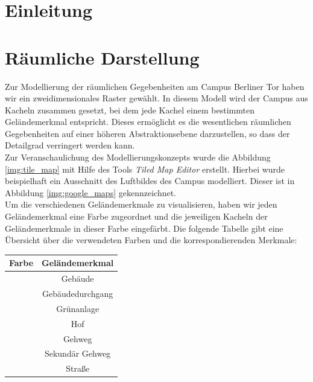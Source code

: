 \documentclass[10pt]{scrartcl}
\author{André Harms, Oliver Steenbuck, Armin Steudte  \\ Carsten Noetzel, Dennis Blauhut, Torben Becker}
\title{\titletext}
\date{26.10.2011}
\begin{document}
\maketitle

\setcounter{tocdepth}{3}
\tableofcontents
\listoffigures

\section{Einleitung}

\section{Räumliche Darstellung}
Zur Modellierung der räumlichen Gegebenheiten am Campus Berliner Tor haben wir ein zweidimensionales Raster gewählt.
In diesem Modell wird der Campus aus Kacheln zusammen gesetzt, bei dem jede Kachel einem bestimmten Geländemerkmal entspricht.
Dieses ermöglicht es die wesentlichen räumlichen Gegebenheiten auf einer höheren Abstraktionsebene darzustellen, so dass der Detailgrad verringert werden kann.\\
Zur Veranschaulichung des Modellierungskonzepts wurde die Abbildung \ref{img:tile_map} mit Hilfe des Tools \textit{Tiled Map Editor} erstellt. Hierbei wurde beispielhaft ein Ausschnitt des Luftbildes des Campus modelliert.
Dieser ist in Abbildung \ref{img:google_maps} gekennzeichnet.\\
Um die verschiedenen Geländemerkmale zu visualisieren, haben wir jeden Geländemerkmal eine Farbe zugeordnet und die jeweiligen Kacheln der Geländemerkmale in dieser Farbe eingefärbt. Die folgende Tabelle gibt eine Übersicht über die verwendeten Farben und die korrespondierenden Merkmale:


\begin{tabular}{|c|c|}
\hline 
\textbf{Farbe} & \textbf{Geländemerkmal} \\ 
\hline 
\cellcolor{gebaude} & Gebäude \\
\hline 
\cellcolor{gebaude_durchgang} & Gebäudedurchgang\\
\hline 
\cellcolor{gruenanlage} &  Grünanlage\\ 
\hline 
\cellcolor{hof} &  Hof\\ 
\hline 
\cellcolor{gehweg} & Gehweg\\ 
\hline 
\cellcolor{gehweg_sek} & Sekundär Gehweg\\
\hline 
\cellcolor{strasse} & Straße\\ 
\hline 
\end{tabular} 
\end{document}
